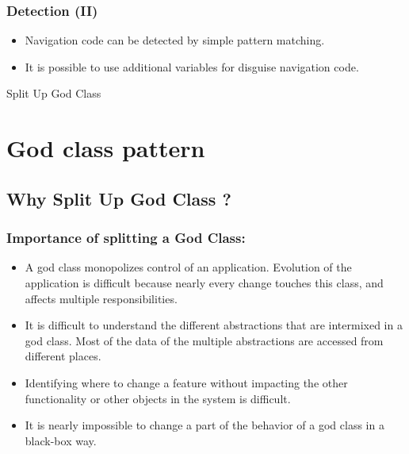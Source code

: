 \documentclass{beamer}
\begin{document}
\begin{frame}
\frametitle{Detection (II)}
\begin{itemize}
\item Navigation code can be detected by simple pattern matching.
\item It is possible to use  additional variables for disguise navigation code.
\end{itemize}
\end{frame}



\begin{center}
\begin{frame}
Split Up God Class
\end{frame}
\end{center}
\section{God class pattern}
\subsection{Why Split Up God Class ?}
\begin{frame}
\frametitle{Importance of splitting a God Class:}
\begin{itemize}
\item A god class monopolizes control of an application. Evolution of the application is difficult because nearly every change touches this class, and affects multiple responsibilities.
\item It is difficult to understand the different abstractions that are intermixed in a god class. Most of the data of the multiple abstractions are accessed from different places.
\item Identifying where to change a feature without impacting the other functionality or other objects in the system is difficult.
\item It is nearly impossible to change a part of the behavior of a god class in a black-box way.
\end{itemize}
\end{frame}
\end{document}
